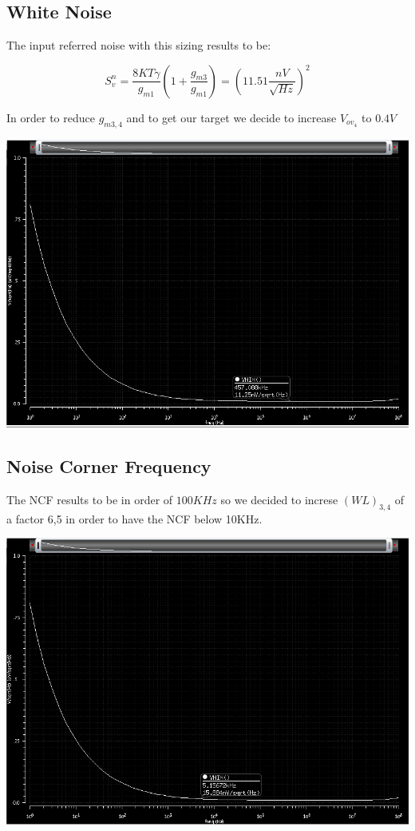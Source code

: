 \subsection{White Noise} %
\label{ssub:white_noise}


The input referred noise with this sizing results to be:

\begin{equation}
  S_v^n= \frac{8KT\gamma}{g_{m1}}(1+\frac{g_ {m3}}{g_{m1}}) = (11.51 \frac{nV}{\sqrt{Hz}})^2
\end{equation}

In order to reduce $g_{m3,4}$ and to get our target we decide to increase $V_{ov_4}$ to $0.4V$

\centering
\includegraphics[width=1\textwidth]{Capitoli/wn1st.png}
\raggedright



\subsection{Noise Corner Frequency} %
\label{ssub:noise_corner_frequency}

The NCF results to be in order of $100KHz$ so we decided to increse $(WL)_{3,4}$ of a factor 6,5 in order to have the NCF below 10KHz.


\centering
\includegraphics[width=1\textwidth]{Capitoli/ncf1.png}
\raggedright

